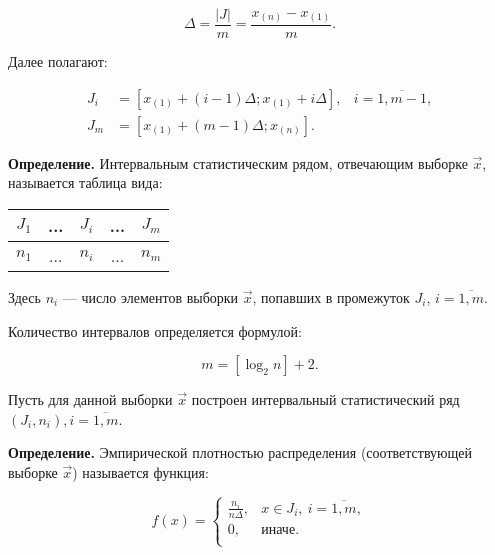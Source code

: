 \begin{equation}\label{eq:06}
    \Delta = \frac{|J|}{m} = \frac{x_{(n)} - x_{(1)}}{m}.
\end{equation}

\clearpage
Далее полагают:

\begin{equation}\label{eq:07}
    \begin{aligned}
        J_i &= [x_{(1)} + (i - 1) \Delta; x_{(1)} + i \Delta],
        & i = \overline{1, m-1},\\
        J_m &= [x_{(1)} + (m - 1) \Delta; x_{(n)}].
    \end{aligned}
\end{equation}

\textbf{Определение.} Интервальным статистическим рядом, отвечающим
выборке $\vec{x}$, называется таблица вида:

\begin{table}[htb]
    \centering
    \begin{tabular}{|c|c|c|c|c|}
        \hline
        $J_1$ & ... & $J_i$ & ... & $J_m$ \\
        \hline
        $n_1$ & ... & $n_i$ & ... & $n_m$ \\
        \hline
    \end{tabular}
\end{table}

Здесь $n_i$ --- число элементов выборки $\vec{x}$, попавших в промежуток $J_i$,
$i= \overline{1,m}$.

Количество интервалов определяется формулой:

\begin{equation}\label{eq:09}
    m = [\log_2 n] + 2.
\end{equation}

Пусть для данной выборки $\vec{x}$ построен интервальный статистический
ряд~$(J_i, n_i), i=\overline{1,m}$.

\textbf{Определение.} Эмпирической плотностью распределения (соответствующей
выборке $\vec{x}$) называется функция:

\begin{equation}
    f(x) =
    \begin{cases}
        \frac{n_i}{n \Delta}, &x \in J_i,~i = \overline{1, m}, \\
        0, &\text{иначе}. \\
    \end{cases}
\end{equation}

